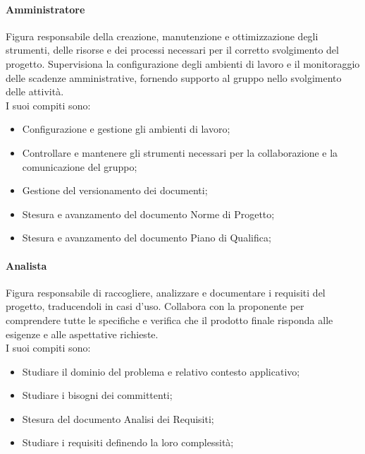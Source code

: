 \documentclass[10pt]{article}
\begin{document}
\begin{justify}
        \paragraph{Amministratore}
        Figura responsabile della creazione, manutenzione e ottimizzazione degli strumenti, delle risorse e dei processi necessari per il corretto svolgimento del progetto. Supervisiona la configurazione degli ambienti di lavoro e il monitoraggio delle scadenze amministrative, fornendo supporto al gruppo nello svolgimento delle attività.\\
        I suoi compiti sono:
        \begin{itemize}
            \item Configurazione e gestione gli ambienti di lavoro;
            \item Controllare e mantenere gli strumenti necessari per la collaborazione e la comunicazione del gruppo;
            \item Gestione del versionamento dei documenti;
            \item Stesura e avanzamento del documento Norme di Progetto;
            \item Stesura e avanzamento del documento Piano di Qualifica;
        \end{itemize}

        \paragraph{Analista}
        Figura responsabile di raccogliere, analizzare e documentare i requisiti del progetto, traducendoli in casi d'uso. Collabora con la proponente per comprendere tutte le specifiche e verifica che il prodotto finale risponda alle esigenze e alle aspettative richieste.\\
        I suoi compiti sono:
        \begin{itemize}
            \item Studiare il dominio del problema e relativo contesto applicativo;
            \item Studiare i bisogni dei committenti;
            \item Stesura del documento Analisi dei Requisiti;
            \item Studiare i requisiti definendo la loro complessità;
        \end{itemize}
    

\end{justify}
\end{document}
